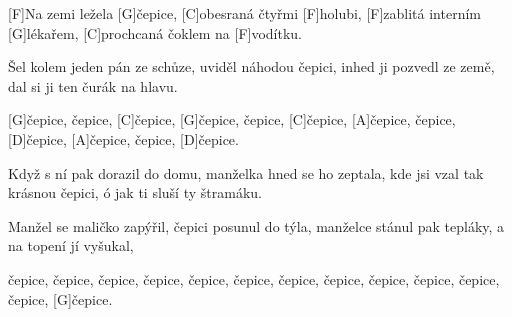 

[F]Na zemi ležela [G]\null čepice,
[C]obesraná čtyřmi [F]holubi,
[F]zablitá interním [G]lékařem,
[C]prochcaná čoklem na [F]vodítku.

Šel kolem jeden pán ze schůze,
uviděl náhodou čepici,
inhed ji pozvedl ze země,
dal si ji ten čurák na hlavu.

[G]\null čepice, čepice, [C]\null čepice,
[G]\null čepice, čepice, [C]\null čepice,
[A]\null čepice, čepice, [D]\null čepice,
[A]\null čepice, čepice, [D]\null čepice.

Když s ní pak dorazil do domu,
manželka hned se ho zeptala,
kde jsi vzal tak krásnou čepici,
ó jak ti sluší ty štramáku.

Manžel se maličko zapýřil,
čepici posunul do týla,
manželce stánul pak tepláky,
a na topení jí vyšukal,

čepice, čepice, čepice,
čepice, čepice, čepice,
čepice, čepice, čepice, čepice, čepice, čepice, [G]\null čepice.